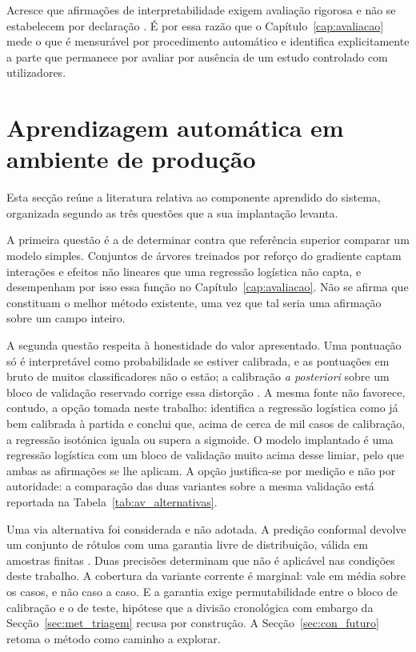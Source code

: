 Acresce que afirmações de interpretabilidade exigem avaliação rigorosa e não se estabelecem por
declaração \autocite{doshivelez2018considerations}. É por essa razão que o Capítulo~\ref{cap:avaliacao}
mede o que é mensurável por procedimento automático e identifica explicitamente a parte que
permanece por avaliar por ausência de um estudo controlado com utilizadores.

\section{Aprendizagem automática em ambiente de produção}
\label{sec:ctx_producao}

Esta secção reúne a literatura relativa ao componente aprendido do sistema, organizada segundo as
três questões que a sua implantação levanta.

A primeira questão é a de determinar contra que referência superior comparar um modelo simples.
Conjuntos de árvores treinados por reforço do gradiente \autocite{friedman2001gbm} captam interações
e efeitos não lineares que uma regressão logística não capta, e desempenham por isso essa função no
Capítulo~\ref{cap:avaliacao}. Não se afirma que constituam o melhor método existente, uma vez que
tal seria uma afirmação sobre um campo inteiro.

A segunda questão respeita à honestidade do valor apresentado. Uma pontuação só é interpretável
como probabilidade se estiver calibrada, e as pontuações em bruto de muitos classificadores não o
estão; a calibração \emph{a posteriori} sobre um bloco de validação reservado corrige essa
distorção \autocite{niculescu2005calibration}. A mesma fonte não favorece, contudo, a opção tomada
neste trabalho: identifica a regressão logística como já bem calibrada à partida e conclui que,
acima de cerca de mil casos de calibração, a regressão isotónica iguala ou supera a sigmoide. O
modelo implantado é uma regressão logística com um bloco de validação muito acima desse limiar,
pelo que ambas as afirmações se lhe aplicam. A opção justifica-se por medição e não por autoridade:
a comparação das duas variantes sobre a mesma validação está reportada na
Tabela~\ref{tab:av_alternativas}.

Uma via alternativa foi considerada e não adotada. A predição conformal devolve um conjunto de
rótulos com uma garantia livre de distribuição, válida em amostras finitas
\autocite{vovk2005algorithmic, angelopoulos2023conformal}. Duas precisões determinam que não é aplicável nas condições deste trabalho. A cobertura da
variante corrente é marginal: vale em média sobre os casos, e não caso a caso. E a garantia exige
permutabilidade entre o bloco de calibração e o de teste, hipótese que a divisão cronológica com
embargo da Secção~\ref{sec:met_triagem} recusa por construção. A Secção~\ref{sec:con_futuro} retoma o método
como caminho a explorar.

